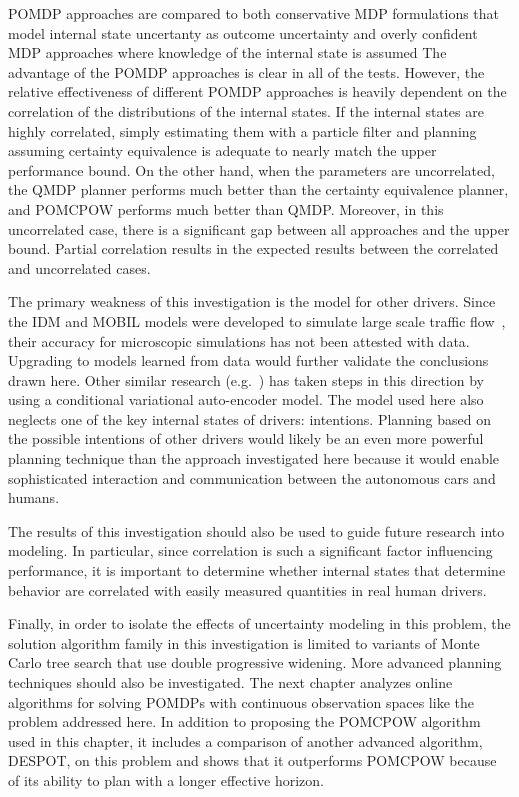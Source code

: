 POMDP approaches are compared to both conservative MDP formulations that model internal state uncertanty as outcome uncertainty and overly confident MDP approaches where knowledge of the internal state is assumed
The advantage of the POMDP approaches is clear in all of the tests.
However, the relative effectiveness of different POMDP approaches is heavily dependent on the correlation of the distributions of the internal states.
If the internal states are highly correlated, simply estimating them with a particle filter and planning assuming certainty equivalence is adequate to nearly match the upper performance bound.
On the other hand, when the parameters are uncorrelated, the QMDP planner performs much better than the certainty equivalence planner, and POMCPOW performs much better than QMDP.
Moreover, in this uncorrelated case, there is a significant gap between all approaches and the upper bound.
Partial correlation results in the expected results between the correlated and uncorrelated cases.

The primary weakness of this investigation is the model for other drivers.
Since the IDM and MOBIL models were developed to simulate large scale traffic flow~\cite{treiber2000idm,kesting2007mobil}, their accuracy for microscopic simulations has not been attested with data.
Upgrading to models learned from data would further validate the conclusions drawn here.
Other similar research (e.g.~\cite{schmerling2018multimodal}) has taken steps in this direction by using a conditional variational auto-encoder model.
The model used here also neglects one of the key internal states of drivers: intentions.
Planning based on the possible intentions of other drivers would likely be an even more powerful planning technique than the approach investigated here because it would enable sophisticated interaction and communication between the autonomous cars and humans.

The results of this investigation should also be used to guide future research into modeling.
In particular, since correlation is such a significant factor influencing performance, it is important to determine whether internal states that determine behavior are correlated with easily measured quantities in real human drivers.

Finally, in order to isolate the effects of uncertainty modeling in this problem, the solution algorithm family in this investigation is limited to variants of Monte Carlo tree search that use double progressive widening.
More advanced planning techniques should also be investigated.
The next chapter analyzes online algorithms for solving POMDPs with continuous observation spaces like the problem addressed here.
In addition to proposing the POMCPOW algorithm used in this chapter, it includes a comparison of another advanced algorithm, DESPOT, on this problem and shows that it outperforms POMCPOW because of its ability to plan with a longer effective horizon.
